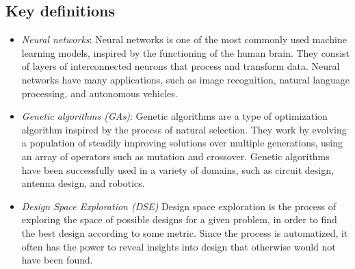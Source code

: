 \documentclass[sigconf]{acmart}
\begin{document}
\subsection{Key definitions}
\begin{itemize}
\setlength\itemsep{1em}
\item[] \emph{Neural networks}: Neural networks is one of the most commonly used machine learning models, inspired by the functioning of the human brain. 
                                They consist of layers of interconnected neurons that process and transform data.
                                Neural networks have many applications, such as image recognition, natural language processing, and autonomous vehicles.

\item[] \emph{Genetic algorithms (GAs)}: 
                                Genetic algorithms are a type of optimization algorithm inspired by the process of natural selection. 
                                They work by evolving a population of steadily improving solutions over multiple generations, 
                                using an array of operators such as mutation and crossover.
                                Genetic algorithms have been successfully used in a variety of domains, such as circuit design, antenna design, and robotics.

\item[] \emph{Design Space Exploration (DSE)}
                                Design space exploration is the process of exploring the space of possible designs for a given problem, in order to find the best design
                                according to some metric. Since the process is automatized, it often has the power to reveal insights into design that otherwise would not have been found.
\setlength\itemsep{0em}
\end{itemize}
\end{document}
